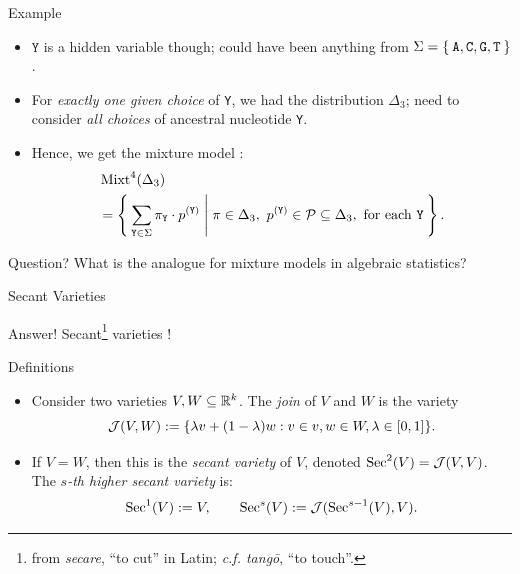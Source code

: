 \begin{frame}{Example}
    \begin{itemize}
        \item  $\texttt{Y}$ is a hidden variable though; could have been anything from $\Sigma = \Set{\texttt{A}, \texttt{C}, \texttt{G}, \texttt{T}}$.

        \item For \emph{exactly one given choice} of \texttt{Y}, we had the distribution $\Delta_{3}$; need to consider \emph{all choices} of ancestral nucleotide \texttt{Y}.

        \item Hence, we get the mixture model \cite{EAsalmon}:
            \vspace*{-8pt}
        \begin{equation*}
            \begin{split}
                &\Mixt^{4}(\Delta_{3}) \\
                &= \Set{\sum_{ \texttt{Y} \in \Sigma  } \pi_{\texttt{Y}} \cdot p^{(\texttt{Y})} | \pi \in \Delta_{3},\ p^{(\texttt{Y})} \in \mc{P} \subseteq \Delta_{3}, \text{ for each \texttt{Y}} }.
            \end{split}
        \end{equation*}

    \end{itemize}

    \begin{block}{Question?}
    What is the analogue for mixture models in algebraic statistics?
    \end{block}

\end{frame}

\begin{frame}{Secant Varieties}
    \begin{block}{Answer!}
        Secant\footnote{from \emph{secare}, ``to cut'' in Latin; \emph{c.f. tangō}, ``to touch''.} varieties \cite{BSSSMD2009}!
    \end{block}

    \begin{block}{Definitions}
        \begin{itemize}
        \item Consider two varieties $V, W \subseteq \mathbb{R}^{k}$. The \emph{join} of $V$ and $W$ is the variety
        $$ \mathcal{J}(V,W) := \{ \lambda v + (1-\lambda)w : v \in v, w \in W, \lambda \in [0,1] \}. $$

        \item If $V = W$, then this is the \emph{secant variety} of $V$, denoted $\operatorname{Sec}^{2}(V) = \mathcal{J}(V,V)$. The \emph{$s$-th higher secant variety} is:
        $$ \operatorname{Sec}^{1}(V) := V, \qquad \operatorname{Sec}^{s}(V) := \mathcal{J}(\operatorname{Sec}^{s-1}(V), V ). $$
        \end{itemize}
    \end{block}

\end{frame}

